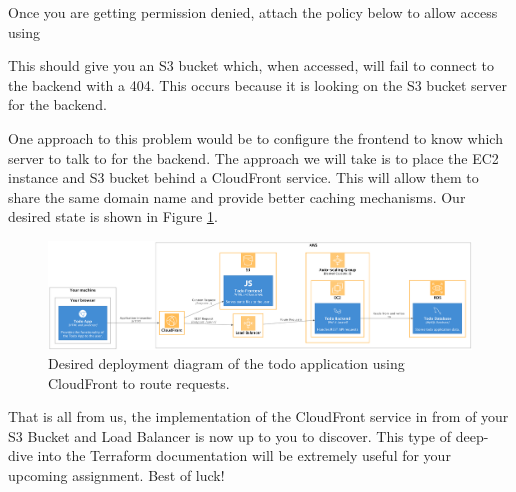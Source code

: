 \documentclass{csse4400}
\begin{document}
\noindent Once you are getting permission denied,
attach the policy below to allow access using 


This should give you an S3 bucket which, when accessed,
will fail to connect to the backend with a 404.
This occurs because it is looking on the S3 bucket server for the backend.

One approach to this problem would be to configure the frontend to know which server to talk to for the backend.
The approach we will take is to place the EC2 instance and S3 bucket behind a CloudFront service.
This will allow them to share the same domain name and provide better caching mechanisms.
Our desired state is shown in Figure \ref{fig:s3deployment}.

\begin{figure}[ht]
\includegraphics[width=\textwidth]{diagrams/S3Deployment}
\caption{Desired deployment diagram of the todo application using CloudFront to route requests.}
\label{fig:s3deployment}
\end{figure}

That is all from us,
the implementation of the CloudFront service in from of your S3 Bucket and Load Balancer is now up to you to discover.
This type of deep-dive into the Terraform documentation will be extremely useful for your upcoming assignment.
Best of luck!



\end{document}
